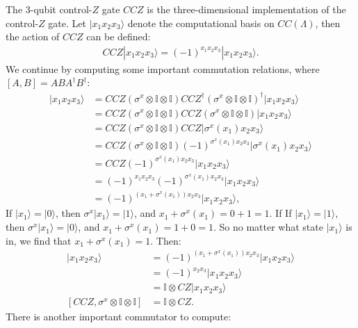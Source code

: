 \documentclass[12pt]{article}
\def\II{\mathbb{I}}
\theoremstyle{definition}
\begin{document}
The $3$-qubit control-$Z$ gate $CCZ$ is the three-dimensional implementation of the control-$Z$ gate. Let $|x_1x_2x_3\rangle$ denote the computational basis on $CC(\Lambda)$, then the action of $CCZ$ can be defined:
    \begin{align}
        CCZ|x_1x_2x_3\rangle = (-1)^{x_1x_2x_3}|x_1x_2x_3\rangle .
    \end{align}
We continue by computing some important commutation relations, where $[A,B] = ABA^\dagger B^\dagger$:
    \begin{align}
        [CCZ,\sigma^x\otimes\II\otimes\II]|x_1x_2x_3\rangle &= CCZ(\sigma^x\otimes\II\otimes\II)CCZ^\dagger(\sigma^x\otimes\II\otimes\II)^\dagger|x_1x_2x_3\rangle\\
        &= CCZ(\sigma^x\otimes\II\otimes\II)CCZ(\sigma^x\otimes\II\otimes\II)|x_1x_2x_3\rangle\\
        &= CCZ(\sigma^x\otimes\II\otimes\II)CCZ|\sigma^x(x_1)x_2x_3\rangle\\
        &= CCZ(\sigma^x\otimes\II\otimes\II)(-1)^{\sigma^x(x_1)x_2x_3}|\sigma^x(x_1)x_2x_3\rangle\\
        &= CCZ(-1)^{\sigma^x(x_1)x_2x_3}|x_1x_2x_3\rangle\\
        &= (-1)^{x_1x_2x_3}(-1)^{\sigma^x(x_1)x_2x_3}|x_1x_2x_3\rangle\\
        &= (-1)^{(x_1+\sigma^x(x_1))x_2x_3}|x_1x_2x_3\rangle,
    \end{align}
If $|x_1\rangle = |0\rangle$, then $\sigma^x|x_1\rangle = |1\rangle$, and $x_1+\sigma^x(x_1) = 0+1 = 1$. If If $|x_1\rangle = |1\rangle$, then $\sigma^x|x_1\rangle = |0\rangle$, and $x_1+\sigma^x(x_1) = 1+0 = 1$. So no matter what state $|x_1\rangle$ is in, we find that $x_1+\sigma^x(x_1) = 1$. Then:
    \begin{align}
        [CCZ,\sigma^x\otimes\II\otimes\II]|x_1x_2x_3\rangle &= (-1)^{(x_1+\sigma^x(x_1))x_2x_3}|x_1x_2x_3\rangle\\
        &= (-1)^{x_2x_3}|x_1x_2x_3\rangle\\
        &= \II\otimes CZ|x_1x_2x_3\rangle\\
        [CCZ,\sigma^x\otimes\II\otimes\II] &= \II\otimes CZ.
    \end{align}
There is another important commutator to compute:
\end{document}
